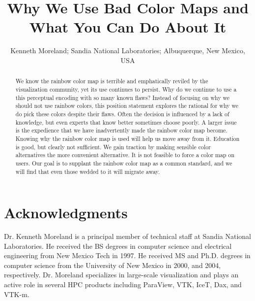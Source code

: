 \documentclass[letterpaper,twocolumn,fleqn]{article}
\title{Why We Use Bad Color Maps and What You Can Do About It}
\author{Kenneth Moreland; Sandia National Laboratories; Albuquerque, New
  Mexico, USA}
\date{} %
\begin{document}
 

\maketitle 

\thispagestyle{empty} %

\begin{abstract}
\noindent
We know the rainbow color map is terrible and emphatically reviled by the
visualization community, yet its use continues to persist. Why do we
continue to use a this perceptual encoding with so many known flaws?
Instead of focusing on why we should not use rainbow colors, this position
statement explores the rational for why we do pick these colors despite
their flaws. Often the decision is influenced by a lack of knowledge, but
even experts that know better sometimes choose poorly. A larger issue is
the expedience that we have inadvertently made the rainbow color map
become. Knowing why the rainbow color map is used will help us move away
from it. Education is good, but clearly not sufficient. We gain traction by
making sensible color alternatives the more convenient alternative. It is
not feasible to force a color map on users. Our goal is to supplant the
rainbow color map as a common standard, and we will find that even those
wedded to it will migrate away.
\end{abstract}


\section{Acknowledgments} 


\small


\begin{biography}
\noindent
Dr. Kenneth Moreland is a principal member of technical staff at Sandia
National Laboratories. He received the BS degrees in computer science and
electrical engineering from New Mexico Tech in 1997. He received MS and
Ph.D. degrees in computer science from the University of New Mexico in
2000, and 2004, respectively. Dr. Moreland specializes in large-scale
visualization and plays an active role in several HPC products including
ParaView, VTK, IceT, Dax, and VTK-m.
\end{biography}
\end{document}
